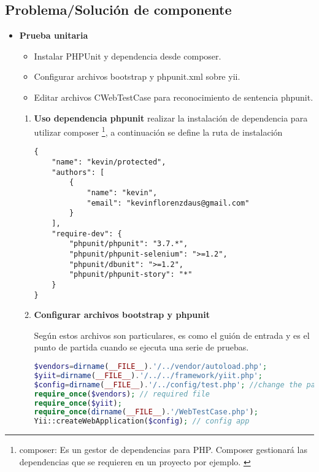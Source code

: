 \subsection{Problema/Solución de componente}

\begin{itemize}

\item \textbf{Prueba unitaria}

\begin{itemize}

\item Instalar PHPUnit y dependencia desde composer.
\item Configurar archivos bootstrap y phpunit.xml sobre yii.
\item Editar archivos CWebTestCase para reconocimiento de sentencia phpunit.

\end{itemize}

\begin{enumerate}

\item \textbf{Uso dependencia phpunit} realizar la instalación de
dependencia para utilizar composer \footnote{composer: Es un gestor de
dependencias para PHP. Composer gestionará las dependencias que se requieren
en un proyecto por ejemplo. \cite{composer}}, a continuación se define la
ruta de instalación 

\begin{lstlisting}[caption={Dependencia de phpunit.}]
{
    "name": "kevin/protected",
    "authors": [
        {
            "name": "kevin",
            "email": "kevinflorenzdaus@gmail.com"
        }
    ],
    "require-dev": {
        "phpunit/phpunit": "3.7.*",
        "phpunit/phpunit-selenium": ">=1.2",
        "phpunit/dbunit": ">=1.2",
        "phpunit/phpunit-story": "*"
    }
}
\end{lstlisting}

\item \textbf{Configurar archivos bootstrap y phpunit}

Según \cite{testing} estos archivos son particulares, es como el guión de
entrada y es el punto de partida cuando se ejecuta una serie de pruebas.

\begin{lstlisting}[language=PHP, caption={Estructura de configuración de archivo bootstrap.}]
$vendors=dirname(__FILE__).'/../vendor/autoload.php';
$yiit=dirname(__FILE__).'/../../framework/yiit.php';
$config=dirname(__FILE__).'/../config/test.php'; //change the paths if necessary
require_once($vendors); // required file
require_once($yiit);
require_once(dirname(__FILE__).'/WebTestCase.php');
Yii::createWebApplication($config); // config app
\end{lstlisting}


\end{enumerate}
\end{itemize}
